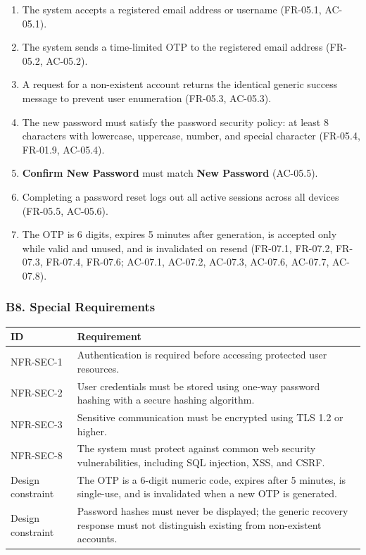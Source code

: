 \documentclass[12pt]{article}
\renewcommand{\baselinestretch}{1.5}
\begin{document}
\begin{enumerate}
\item The system accepts a registered email address or username (FR-05.1, AC-05.1).
\item The system sends a time-limited OTP to the registered email address (FR-05.2, AC-05.2).
\item A request for a non-existent account returns the identical generic success message to prevent user enumeration (FR-05.3, AC-05.3).
\item The new password must satisfy the password security policy: at least 8 characters with lowercase, uppercase, number, and special character (FR-05.4, FR-01.9, AC-05.4).
\item \textbf{Confirm New Password} must match \textbf{New Password} (AC-05.5).
\item Completing a password reset logs out all active sessions across all devices (FR-05.5, AC-05.6).
\item The OTP is 6 digits, expires 5 minutes after generation, is accepted only while valid and unused, and is invalidated on resend (FR-07.1, FR-07.2, FR-07.3, FR-07.4, FR-07.6; AC-07.1, AC-07.2, AC-07.3, AC-07.6, AC-07.7, AC-07.8).
\end{enumerate}
\par\medskip

\hypertarget{sec:b8-special-requirements}{}
\subsubsection*{B8. Special Requirements}
\par\medskip

\begingroup
\small
\renewcommand{\baselinestretch}{1.0}\selectfont
\renewcommand{\arraystretch}{1.15}
\setlength{\tabcolsep}{6pt}
\begin{longtable}{|>{\raggedright\arraybackslash}p{}|>{\raggedright\arraybackslash}p{}|}
\hline
\textbf{ID} & \textbf{Requirement} \\ \hline
\endhead
NFR-SEC-1 & Authentication is required before accessing protected user resources. \\ \hline
NFR-SEC-2 & User credentials must be stored using one-way password hashing with a secure hashing algorithm. \\ \hline
NFR-SEC-3 & Sensitive communication must be encrypted using TLS 1.2 or higher. \\ \hline
NFR-SEC-8 & The system must protect against common web security vulnerabilities, including SQL injection, XSS, and CSRF. \\ \hline
Design constraint & The OTP is a 6-digit numeric code, expires after 5 minutes, is single-use, and is invalidated when a new OTP is generated. \\ \hline
Design constraint & Password hashes must never be displayed; the generic recovery response must not distinguish existing from non-existent accounts. \\ \hline
\end{longtable}
\endgroup
\par\medskip
\end{document}
